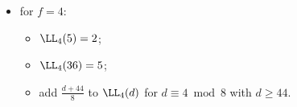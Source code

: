 \begin{definition}
\begin{itemize}
\begin{itemize}
\item[] $\LL_3(d)=2$ for $d\equiv 5\bmod 6$;
\item[] $\LL_3(6)=4$;
\item[] $\LL_3(7)=2$;
\item[] $\LL_3(8)=4$;
\item[] $\LL_3(9)=4$;
\item[] $\LL_3(10)=5$;
\item[] $\LL_3(15)=26$;
\item[] add $\frac{d+20}{6}$ to $\LL_3(d)$ for $d\equiv 4\bmod 6$ 
with $d\geq 16$;
\item[] add 4 to $\LL_3(d)$ for $d\equiv 3\bmod 6$ 
with $d\geq 21$.
\end{itemize}
\item for $f=4$:
\begin{itemize}
\item[] $\LL_4(5)=2$;
\item[] $\LL_4(36)=5$;
\item[] add $\frac{d+44}{8}$ to $\LL_4(d)$ for $d\equiv 4\bmod 8$ 
with $d\geq 44$.
\end{itemize}
\end{itemize}
\end{definition}
